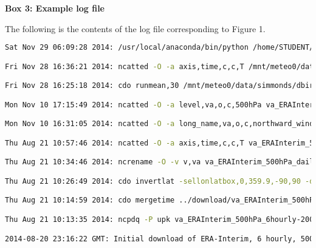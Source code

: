 \textbf{Box 3: Example log file}

The following is the contents of the log file corresponding to Figure 1. 

\begin{lstlisting}[language=bash] 
Sat Nov 29 06:09:28 2014: /usr/local/anaconda/bin/python /home/STUDENT/dbirving/phd/visualisation/plot_hilbert.py /mnt/meteo0/data/simmonds/dbirving/ERAInterim/data/va_ERAInterim_500hPa_030day-runmean_native.nc va hilbert_zw3_w19_va_ERAInterim_500hPa_030day-runmean_native-55S_1986-05-22_2006-07-29.png 1 2 --latitude -55 --dates 1986-05-22 2006-07-29 --wavenumbers 1 9 --figure_size 15 6 (Git hash: 8a42fff) 

Fri Nov 28 16:36:21 2014: ncatted -O -a axis,time,c,c,T /mnt/meteo0/data/simmonds/dbirving/ERAInterim/data/va_ERAInterim_500hPa_030day-runmean_native.nc

Fri Nov 28 16:25:18 2014: cdo runmean,30 /mnt/meteo0/data/simmonds/dbirving/ERAInterim/data/va_ERAInterim_500hPa_daily_native.nc /mnt/meteo0/data/simmonds/dbirving/ERAInterim/data/va_ERAInterim_500hPa_030day-runmean_native.nc

Mon Nov 10 17:15:49 2014: ncatted -O -a level,va,o,c,500hPa va_ERAInterim_500hPa_daily_native.nc

Mon Nov 10 16:31:05 2014: ncatted -O -a long_name,va,o,c,northward_wind va_ERAInterim_500hPa_daily_native.nc

Thu Aug 21 10:57:46 2014: ncatted -O -a axis,time,c,c,T va_ERAInterim_500hPa_daily_native.nc

Thu Aug 21 10:34:46 2014: ncrename -O -v v,va va_ERAInterim_500hPa_daily_native.nc

Thu Aug 21 10:26:49 2014: cdo invertlat -sellonlatbox,0,359.9,-90,90 -daymean va_ERAInterim_500hPa_6hourly_native.nc va_ERAInterim_500hPa_daily_native.nc

Thu Aug 21 10:14:59 2014: cdo mergetime ../download/va_ERAInterim_500hPa_6hourly-1979-1988_native_unpacked.nc ../download/va_ERAInterim_500hPa_6hourly-1989-1998_native_unpacked.nc ../download/va_ERAInterim_500hPa_6hourly-1999-2008_native_unpacked.nc ../download/va_ERAInterim_500hPa_6hourly-2009-2014_native_unpacked.nc va_ERAInterim_500hPa_6hourly_native.nc 

Thu Aug 21 10:13:35 2014: ncpdq -P upk va_ERAInterim_500hPa_6hourly-2009-2014_native.nc va_ERAInterim_500hPa_6hourly-2009-2014_native_unpacked.nc

2014-08-20 23:16:22 GMT: Initial download of ERA-Interim, 6 hourly, 500 hPa meridional wind (va) data.
\end{lstlisting}


